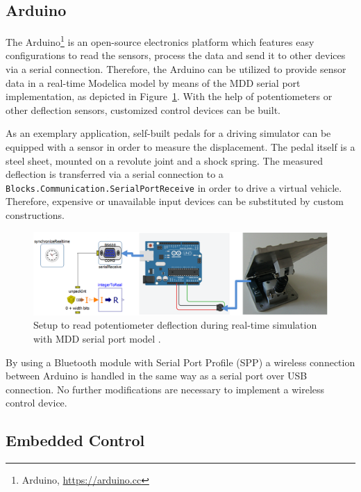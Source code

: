 \documentclass{resources/modelica}
\newcommand{\modelica}[1]{\lstinline[language=modelica]|#1|}
\begin{document}
\subsection{Arduino}

The Arduino\footnote{Arduino, \url{https://arduino.cc}} is an open-source electronics platform which features easy configurations to read the sensors, process the data and send it to other devices via a serial connection.
Therefore, the Arduino can be utilized to provide sensor data in a real-time Modelica model by means of the MDD serial port implementation, as depicted in Figure~\ref{fig:arduino}.
With the help of potentiometers or other deflection sensors, customized control devices can be built.

As an exemplary application, self-built pedals for a driving simulator can be equipped with a sensor in order to measure the displacement. The pedal itself is a steel sheet, mounted on a revolute joint and a shock spring.
The measured deflection is transferred via a serial connection to a \modelica{Blocks.Communication.SerialPortReceive} in order to drive a virtual vehicle.
Therefore, expensive or unavailable input devices can be substituted by custom constructions.
\begin{figure}[htb]
  \centering
  \includegraphics[width=0.9\columnwidth]{figures/arduino}
  \caption{Setup to read potentiometer deflection during real-time simulation with MDD serial port model \protect\footnotemark.}
  \label{fig:arduino}
\end{figure}
\noindent
By using a Bluetooth module with Serial Port Profile (SPP) a wireless connection between Arduino is handled in the same way as a serial port over USB connection.
No further modifications are necessary to implement a wireless control device.

\subsection{Embedded Control}
\label{sec:EmbeddedControl}

\end{document}
